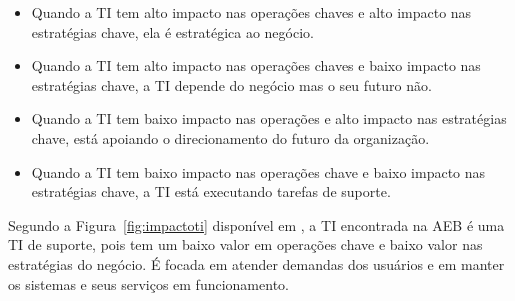 \begin{itemize}
\item Quando a TI tem alto impacto nas operações chaves e alto impacto nas estratégias chave, ela é estratégica ao negócio.
\item Quando a TI tem alto impacto nas operações chaves e baixo impacto nas estratégias chave, a TI depende do negócio mas o seu futuro não.
\item Quando a TI tem baixo impacto nas operações e alto impacto nas estratégias chave, está apoiando o direcionamento do futuro da organização.
\item Quando a TI tem baixo impacto nas operações chave e baixo impacto nas estratégias chave, a TI está executando tarefas de suporte.
\end{itemize}

Segundo a Figura~\ref{fig:impactoti} disponível em \cite{ImplantandoGTI:2012}, a TI encontrada na AEB é uma TI de suporte, pois tem um baixo valor em operações chave e baixo valor nas estratégias do negócio. É focada em atender demandas dos usuários e em manter os sistemas e seus serviços em funcionamento.
